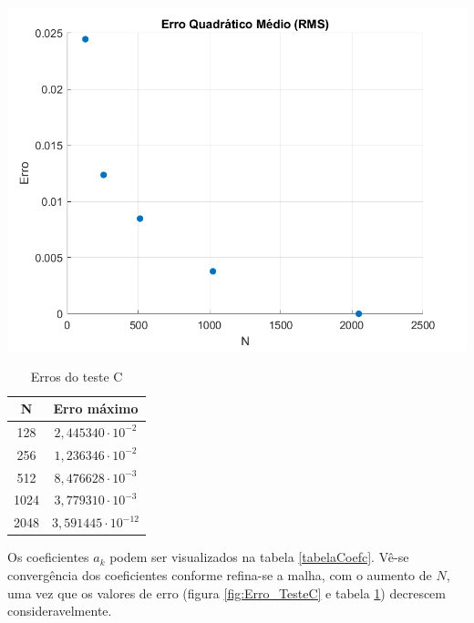 \documentclass[12pt]{article}
\begin{document}
\begin{spacing}{1.5}
\begin{table}
	\begin{minipage}{0.65\linewidth}
        \centering
        \includegraphics[width=1\linewidth]{Imagens/ErrosC.png}
        \label{fig:Erro_TesteC}
	\end{minipage}
	\begin{minipage}{0.32\linewidth}
        \centering 
        \begin{tabular}{c c} 
        \hline\hline 
        \rule{0pt}{3ex} 
        N & Erro máximo\\ [0.5ex] 
        \hline 
        \rule{0pt}{4ex}
                128  & $2,445340   \cdot 10^{-2}$  \\ 
                256  & $1,236346  \cdot 10^{-2}$   \\ 
                512  & $8,476628 \cdot 10^{-3}$  \\ 
                1024 & $3,779310  \cdot 10^{-3}$ \\ 
                2048 & $3,591445  \cdot 10^{-12}$ \\ 
        \hline
        \end{tabular}
        \caption{Erros do teste C} 
        \label{table:errosC}
	\end{minipage}
	\hfill
\end{table}
\vspace{0.1cm}

Os coeficientes $a_k$ podem ser visualizados na tabela \ref{tabelaCoefc}. Vê-se convergência dos coeficientes conforme refina-se a malha, com o aumento de $N$, uma vez que os valores de erro (figura \ref{fig:Erro_TesteC} e tabela \ref{table:errosC}) decrescem consideravelmente.


\end{spacing}
\end{document}
